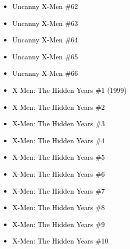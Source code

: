 \documentclass[12pt]{article}
\newcommand{\checkbox}{\raisebox{0.0ex}{\fbox{\rule{0ex}{1.5ex} \rule{1.5ex}{0ex}}}}
\begin{document}
\vspace{0.3cm}
\noindent
\begin{tcolorbox}[
  colback=white!95!gray,
  colframe=black,
  width=\textwidth,
  arc=4mm,
  auto outer arc,
  boxrule=0.8pt,
  left=8pt,right=8pt,top=8pt,bottom=8pt
]
\begin{itemize}[left=0pt,label={\checkbox}]
  \item \textcolor{black}{Uncanny X-Men \#62}
  \item \textcolor{black}{Uncanny X-Men \#63}
  \item \textcolor{black}{Uncanny X-Men \#64}
  \item \textcolor{black}{Uncanny X-Men \#65}
  \item \textcolor{black}{Uncanny X-Men \#66}
  \item \textcolor{black}{X-Men: The Hidden Years \#1 (1999)}
  \item \textcolor{black}{X-Men: The Hidden Years \#2}
  \item \textcolor{black}{X-Men: The Hidden Years \#3}
  \item \textcolor{black}{X-Men: The Hidden Years \#4}
  \item \textcolor{black}{X-Men: The Hidden Years \#5}
  \item \textcolor{black}{X-Men: The Hidden Years \#6}
  \item \textcolor{black}{X-Men: The Hidden Years \#7}
  \item \textcolor{black}{X-Men: The Hidden Years \#8}
  \item \textcolor{black}{X-Men: The Hidden Years \#9}
  \item \textcolor{black}{X-Men: The Hidden Years \#10}
\end{itemize}
\end{tcolorbox}


\newpage
{}
\end{document}
